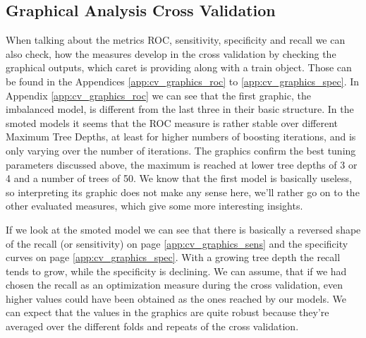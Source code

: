 \documentclass[12pt,a4paper]{article}
\begin{document}
\begin{table}[]
\centering
{}
\caption{Metrics for the models trained on the four different datasets.}
\label{tab:metrics}
\end{table}
\subsection{Graphical Analysis Cross Validation}
When talking about the metrics ROC, sensitivity, specificity and recall we can also check, how the measures develop in the cross validation by checking the graphical outputs, which caret is providing along with a train object. Those can be found in the Appendices \vref{app:cv_graphics_roc} to \vref{app:cv_graphics_spec}. In Appendix  \ref{app:cv_graphics_roc} we can see that the first graphic, the imbalanced model, is different from the last three in their basic structure. In the smoted models it seems that the ROC measure is rather stable over different Maximum Tree Depths, at least for higher numbers of boosting iterations, and is only varying over the number of iterations. The graphics confirm the best tuning parameters discussed above, the maximum is reached at lower tree depths of 3 or 4 and a number of trees of 50. We know that the first model is basically useless, so interpreting its graphic does not make any sense here, we'll rather go on to the other evaluated measures, which give some more interesting insights.

If we look at the smoted model we can see that there is basically a reversed shape of the recall (or sensitivity) on page \vref{app:cv_graphics_sens} and the specificity curves on page \vref{app:cv_graphics_spec}. With a growing tree depth the recall tends to grow, while the specificity is declining. We can assume, that if we had chosen the recall as an optimization measure during the cross validation, even higher values could have been obtained as the ones reached by our models. We can expect that the values in the graphics are quite robust because they're averaged over the different folds and repeats of the cross validation.
\end{document}
